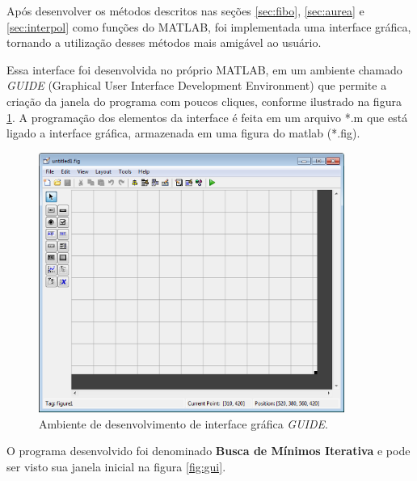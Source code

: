 Após desenvolver os métodos descritos nas seções \ref{sec:fibo}, \ref{sec:aurea} e \ref{sec:interpol} como funções do MATLAB, foi implementada uma interface gráfica, tornando a utilização desses métodos mais amigável ao usuário.\\

\par Essa interface foi desenvolvida no próprio MATLAB, em um ambiente chamado \textit{GUIDE} (Graphical User Interface Development Environment) que permite a criação da janela do programa com poucos cliques, conforme ilustrado na figura \ref{fig:guide}. A programação dos elementos da interface é feita em um arquivo *.m que está ligado a interface gráfica, armazenada em uma figura do matlab (*.fig).

\begin{figure}[H]
	\begin{center}
		\includegraphics[width=10cm]{../gui/guide.png}   
		\caption{Ambiente de desenvolvimento de interface gráfica \textit{GUIDE}.}
		\label{fig:guide}
	\end{center}
\end{figure}

O programa desenvolvido foi denominado \textbf{Busca de Mínimos Iterativa} e pode ser visto sua janela inicial na figura \ref{fig:gui}.

